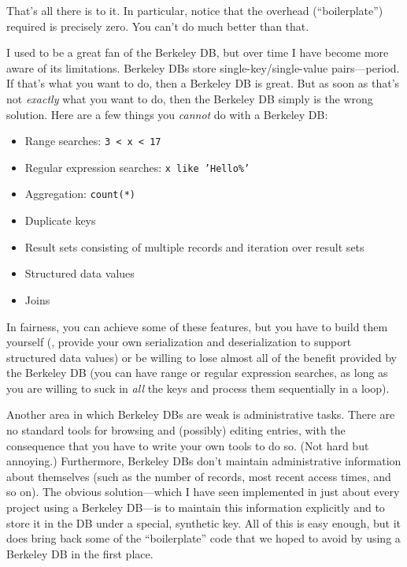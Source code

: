 That's all there is to it. In particular, notice that the overhead
(``boilerplate'') required is precisely zero. You can't do much better
than that.

I used to be a great fan of the Berkeley DB, but over time I have
become more aware of its limitations. Berkeley DBs store
single-key/single-value pairs---period. If that's what you want to do,
then a Berkeley DB is great. But as soon as that's not \emph{exactly}
what you want to do, then the Berkeley DB simply is the wrong
solution.  Here are a few things you \emph{cannot} do with a Berkeley
DB:

\begin{itemize}
\item Range searches: \texttt{3 < x < 17}
\item Regular expression searches: \texttt{x like 'Hello\%'}
\item Aggregation: \texttt{count(*)}
\item Duplicate keys
\item Result sets consisting of multiple records and iteration over
  result sets
\item Structured data values
\item Joins
\end{itemize}

In fairness, you can achieve some of these features, but you have to
build them yourself (\eg, provide your own serialization and
deserialization to support structured data values) or be willing to
lose almost all of the benefit provided by the Berkeley DB (you can
have range or regular expression searches, as long as you are willing
to suck in \emph{all} the keys and process them sequentially in a
loop).

Another area in which Berkeley DBs are weak is administrative tasks.
There are no standard tools for browsing and (possibly) editing
entries, with the consequence that you have to write your own tools to
do so. (Not hard but annoying.) Furthermore, Berkeley DBs don't
maintain administrative information about themselves (such as the
number of records, most recent access times, and so on). The obvious
solution---which I have seen implemented in just about every
project\vadjust{\vfill\pagebreak} using a Berkeley DB---is to maintain this information
explicitly and to store it in the DB under a special, synthetic key. All of this is
easy enough, but it does bring back some of the ``boilerplate'' code
that we hoped to avoid by using a Berkeley DB in the first place.

